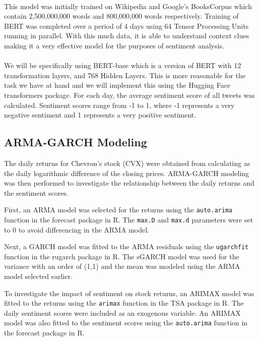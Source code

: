 \documentclass[12pt, letterpaper, titlepage]{article}
\begin{document}
\paragraph{}
This model was initially trained on Wikipedia and Google’s BooksCorpus which contain 2,500,000,000 words and 800,000,000 words respectively. Training of BERT was completed over a period of 4 days using 64 Tensor Processing Units running in parallel. With this much data, it is able to understand context clues making it a very effective model for the purposes of sentiment analysis.

\paragraph{}
We will be specifically using BERT-base which is a version of BERT with 12 transformation layers, and 768 Hidden Layers.\citep{muller_2022} This is more reasonable for the task we have at hand and we will implement this using the Hugging Face transformers package. For each day, the average sentiment score of all tweets was calculated. Sentiment scores range from -1 to 1, where -1 represents a very negative sentiment and 1 represents a very positive sentiment.

\subsection{ARMA-GARCH Modeling}
The daily returns for Chevron's stock (CVX) were obtained from calculating as the daily logarithmic difference of the closing prices. ARMA-GARCH modeling was then performed to investigate the relationship between the daily returns and the sentiment scores.

First, an ARMA model was selected for the returns using the \texttt{auto.arima} function in the forecast package in R. The \texttt{max.D} and \texttt{max.d} parameters were set to 0 to avoid differencing in the ARMA model.

Next, a GARCH model was fitted to the ARMA residuals using the \texttt{ugarchfit} function in the rugarch package in R. The sGARCH model was used for the variance with an order of (1,1) and the mean was modeled using the ARMA model selected earlier.

To investigate the impact of sentiment on stock returns, an ARIMAX model was fitted to the returns using the \texttt{arimax} function in the TSA package in R. The daily sentiment scores were included as an exogenous variable. An ARIMAX model was also fitted to the sentiment scores using the \texttt{auto.arima} function in the forecast package in R.
\end{document}
